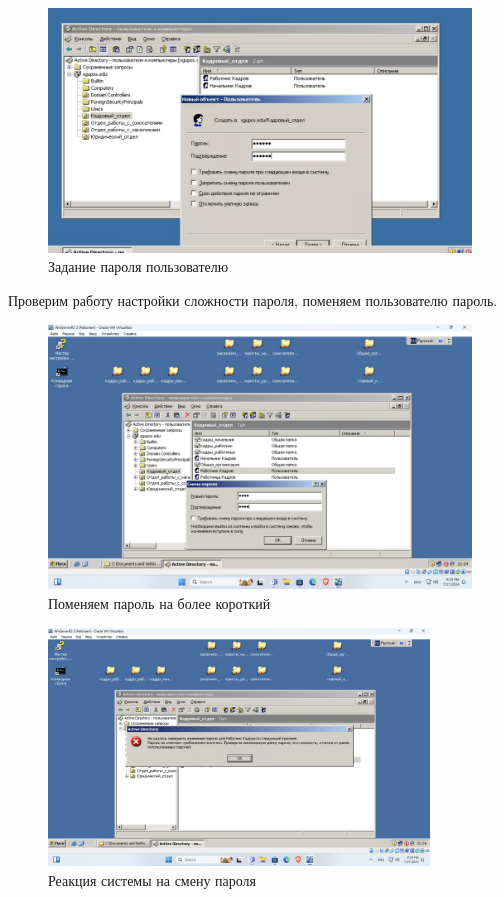 \begin{figure}[H]
  \centering
  \includegraphics[width=1\textwidth]{pict/prac/2}
  \caption{Задание пароля пользователю}
  \label{fig:14}
\end{figure}

Проверим работу настройки сложности пароля, поменяем пользователю пароль.
\begin{figure}[H]
  \centering
  \includegraphics[width=1\textwidth]{pict/prac/50}
  \caption{Поменяем пароль на более короткий}
  \label{fig:50}
\end{figure}

\begin{figure}[H]
  \centering
  \includegraphics[width=0.9\textwidth]{pict/prac/51}
  \caption{Реакция системы на смену пароля}
  \label{fig:51}
\end{figure}


